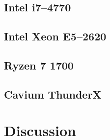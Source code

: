 \documentclass[b5paper]{report}
\begin{document}
\clearpage
\section{Intel\textregistered{} i7--4770}
\begin{figure}[ht]
\end{figure}

\clearpage
\section{Intel\textregistered{} Xeon\textregistered{} E5--2620}
\begin{figure}[ht]
\end{figure}

\clearpage
\section{Ryzen 7 1700}
\begin{figure}[ht]
\end{figure}

\clearpage
\section{Cavium ThunderX}
\begin{figure}[ht]
\end{figure}


\chapter{Discussion}
\end{document}
